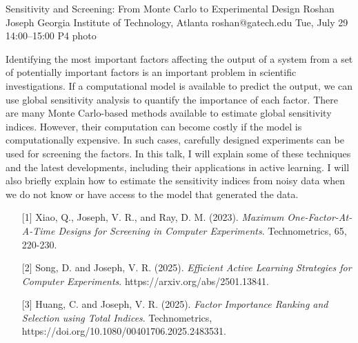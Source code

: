 \clearpage
\begin{talk}
  {Sensitivity and Screening: From Monte Carlo to Experimental Design}%
  {Roshan Joseph}%
  {Georgia Institute of Technology, Atlanta}%
  {roshan@gatech.edu}%
  {}%
  {}%
  {Tue, July 29 14:00–15:00}%
  {P4}%
  {photo}%
  
				
			
Identifying the most important factors affecting the output of a system from a set of potentially important factors is an important problem in scientific investigations. If a computational model is available to predict the output, we can use global sensitivity analysis to quantify the importance of each factor. There are many Monte Carlo-based methods available to estimate global sensitivity indices. However, their computation can become costly if the model is computationally expensive. In such cases, carefully designed experiments can be used for screening the factors. In this talk, I will explain some of these techniques and the latest developments, including their applications in active learning. I will also briefly explain how to estimate the sensitivity indices from noisy data when we do not know or have access to the model that generated the data.
\medskip

\begin{enumerate}
	\item[{[1]}] Xiao, Q., Joseph, V. R., and Ray, D. M. (2023). {\it Maximum One-Factor-At-A-Time  Designs for Screening in Computer Experiments}. Technometrics, 65, 220-230.
    \item[{[2]}] Song, D. and Joseph, V. R. (2025). {\it Efficient Active Learning Strategies for Computer Experiments}. https://arxiv.org/abs/2501.13841.
	\item[{[3]}] Huang, C. and Joseph, V. R. (2025). {\it Factor Importance Ranking and Selection using Total Indices}. Technometrics, https://doi.org/10.1080/00401706.2025.2483531.
\end{enumerate}

\end{talk}

